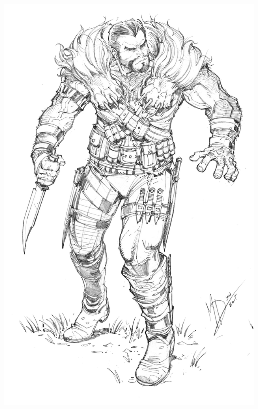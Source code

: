 \begin{multicols*}{2}
\begin{Figure}
\centering
\includegraphics[width=\textwidth]{img/rogue.png}
\end{Figure}
    
\end{multicols*}


\clearpage

